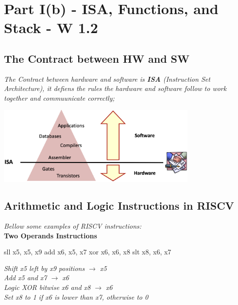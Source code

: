 \chapter{Part I(b) - ISA, Functions, and Stack - W 1.2}
\section{The Contract between HW and SW}
\textit{The Contract between hardware and software is \textbf{ISA} (Instruction Set Architecture), it defiens the rules the hardware and software follow to work together and commuunicate correctly;}
\begin{center}
    \includegraphics[width=0.75\textwidth]{chapters/chapter1b/images/contract.png}
\end{center}

\section{Arithmetic and Logic Instructions in RISCV}
\textit{Bellow some examples of RISCV instructions:} \\
\textbf{Two Operands Instructions} \\
\vspace*{10px}
\begin{minipage}{0.4\textwidth}
\begin{assembly}
sll  x5, x5, x9
add  x6, x5, x7
xor  x6, x6, x8
slt  x8, x6, x7
\end{assembly}
\end{minipage}%
\hfill
\vline
\hfill
\begin{minipage}{0.5\textwidth}
\small
\textit{Shift x5 left by x9 positions $\rightarrow$ x5} \\
\textit{Add x5 and x7 $\rightarrow$ x6} \\
\textit{Logic XOR bitwise x6 and x8 $\rightarrow$ x6} \\
\textit{Set x8 to 1 if x6 is lower than x7, otherwise to 0}
\end{minipage}


